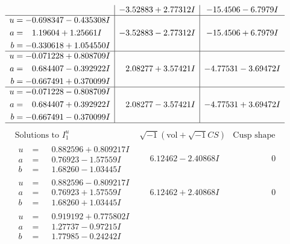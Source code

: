 \documentclass[1p]{elsarticle_modified}
\theoremstyle{definition}
\newcommand{\I}{\sqrt{-1}}
\begin{document}
$$\begin{array}{c|c|c}
 & -3.52883 + 2.77312 I & -15.4506 - 6.7979 I \\ \hline\begin{aligned}
u &= -0.698347 - 0.435308 I \\
a &= \phantom{-}1.19604 + 1.25661 I \\
b &= -0.330618 + 1.054550 I\end{aligned}
 & -3.52883 - 2.77312 I & -15.4506 + 6.7979 I \\ \hline\begin{aligned}
u &= -0.071228 + 0.808709 I \\
a &= \phantom{-}0.684407 - 0.392922 I \\
b &= -0.667491 + 0.370099 I\end{aligned}
 & \phantom{-}2.08277 + 3.57421 I & -4.77531 - 3.69472 I \\ \hline\begin{aligned}
u &= -0.071228 - 0.808709 I \\
a &= \phantom{-}0.684407 + 0.392922 I \\
b &= -0.667491 - 0.370099 I\end{aligned}
 & \phantom{-}2.08277 - 3.57421 I & -4.77531 + 3.69472 I\\
 \hline 
 \end{array}$$\newpage$$\begin{array}{c|c|c}  
\text{Solutions to }I^u_{1}& \I (\text{vol} + \sqrt{-1}CS) & \text{Cusp shape}\\
 \hline 
\begin{aligned}
u &= \phantom{-}0.882596 + 0.809217 I \\
a &= \phantom{-}0.76923 - 1.57559 I \\
b &= \phantom{-}1.68260 - 1.03445 I\end{aligned}
 & \phantom{-}6.12462 - 2.40868 I & \phantom{-0.000000 } 0 \\ \hline\begin{aligned}
u &= \phantom{-}0.882596 - 0.809217 I \\
a &= \phantom{-}0.76923 + 1.57559 I \\
b &= \phantom{-}1.68260 + 1.03445 I\end{aligned}
 & \phantom{-}6.12462 + 2.40868 I & \phantom{-0.000000 } 0 \\ \hline\begin{aligned}
u &= \phantom{-}0.919192 + 0.775802 I \\
a &= \phantom{-}1.27737 - 0.97215 I \\
b &= \phantom{-}1.77985 - 0.24242 I\end{aligned}

\end{array}$$
\end{document}
